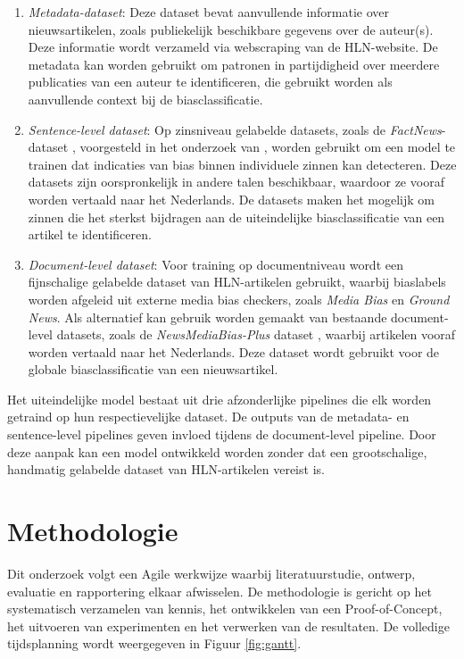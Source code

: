 \begin{enumerate}
    \item \textit{Metadata-dataset}: Deze dataset bevat aanvullende informatie over nieuwsartikelen, zoals publiekelijk beschikbare gegevens over de auteur(s). Deze informatie wordt verzameld via webscraping van de HLN-website. De metadata kan worden gebruikt om patronen in partijdigheid over meerdere publicaties van een auteur te identificeren, die gebruikt worden als aanvullende context bij de biasclassificatie.
    \item \textit{Sentence-level dataset}: Op zinsniveau gelabelde datasets, zoals de \textit{FactNews}-dataset \autocite{Vargas2024}, voorgesteld in het onderzoek van \textcite{Vargas2023}, worden gebruikt om een model te trainen dat indicaties van bias binnen individuele zinnen kan detecteren. Deze datasets zijn oorspronkelijk in andere talen beschikbaar, waardoor ze vooraf worden vertaald naar het Nederlands. De datasets maken het mogelijk om zinnen die het sterkst bijdragen aan de uiteindelijke biasclassificatie van een artikel te identificeren.
    \item \textit{Document-level dataset}: Voor training op documentniveau wordt een fijnschalige gelabelde dataset van HLN-artikelen gebruikt, waarbij biaslabels worden afgeleid uit externe media bias checkers, zoals \textit{Media Bias} en \textit{Ground News}. Als alternatief kan gebruik worden gemaakt van bestaande document-level datasets, zoals de \textit{NewsMediaBias-Plus} dataset \autocite{Raza2024}, waarbij artikelen vooraf worden vertaald naar het Nederlands. Deze dataset wordt gebruikt voor de globale biasclassificatie van een nieuwsartikel.
\end{enumerate}

Het uiteindelijke model bestaat uit drie afzonderlijke pipelines die elk worden getraind op hun respectievelijke dataset. De outputs van de meta\-data- en sentence-level pipelines geven invloed tijdens de document-level pipeline. Door deze aanpak kan een model ontwikkeld worden zonder dat een grootschalige, handmatig gelabelde dataset van HLN-artikelen vereist is.

\section{Methodologie}
\label{sec:methodologie}

Dit onderzoek volgt een Agile werkwijze waarbij literatuurstudie, ontwerp, evaluatie en rapportering elkaar afwisselen. De methodologie is gericht op het systematisch verzamelen van kennis, het ontwikkelen van een Proof-of-Concept, het uitvoeren van experimenten en het verwerken van de resultaten. De volledige tijdsplanning wordt weergegeven in Figuur \ref{fig:gantt}.

